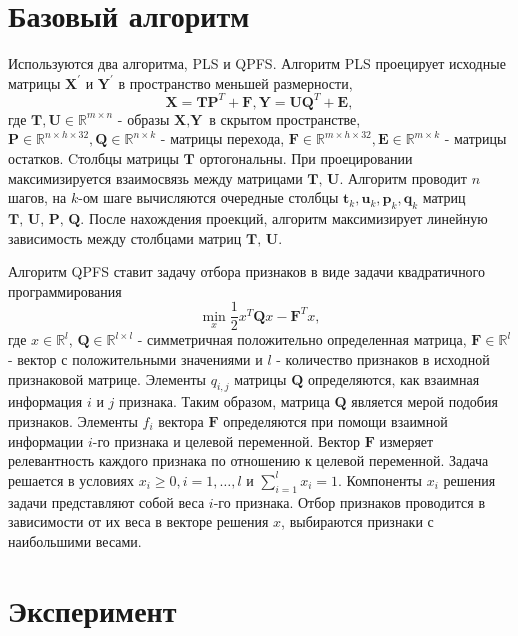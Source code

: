 \documentclass[12pt,twoside]{article}
\begin{document}
\section{Базовый алгоритм}

Используются два алгоритма, PLS и QPFS. 
Алгоритм PLS проецирует исходные матрицы $\textbf{X}^\prime$ и $\textbf{Y}^\prime$ в пространство меньшей размерности, $$\textbf{X} = \textbf{TP}^T + \textbf{F}, \textbf{Y} = \textbf{UQ}^T + \textbf{E} ,$$ где $\textbf{T}, \textbf{U} \in \mathbb{R}^{m \times n}$ 
- образы $\textbf{X}, \textbf{Y}$ в скрытом пространстве, 
$\textbf{P} \in \mathbb{R}^{n \times h \times 32}, \textbf{Q} \in \mathbb{R}^{n \times k}$ - матрицы перехода, 
$\textbf{F} \in \mathbb{R}^{m \times h \times 32}, \textbf{E} \in \mathbb{R}^{m \times k}$ - матрицы остатков. Cтолбцы матрицы $\textbf{T}$ ортогональны. При проецировании максимизируется взаимосвязь между матрицами $\textbf{T, U}$. Алгоритм проводит $n$ шагов, на $k$-ом шаге вычисляются очередные столбцы $\textbf{t}_k,\textbf{u}_k,\textbf{p}_k,\textbf{q}_k$ матриц $\textbf{T, U, P, Q}.$
После нахождения проекций, алгоритм максимизирует линейную зависимость между столбцами матриц $\textbf{T, U}.$

Алгоритм QPFS ставит задачу отбора признаков в виде задачи квадратичного программирования $$\min_x \frac1{2} x^T \textbf{Q}x- \textbf{F}^Tx ,$$
где $x \in \mathbb{R}^l$, $\textbf{Q} \in \mathbb{R}^{l \times l}$ - симметричная положительно определенная матрица, $\textbf{F} \in \mathbb{R}^l$ - вектор с положительными значениями и $l$ - количество признаков в исходной признаковой матрице. Элементы $q_{i,j}$ матрицы $\textbf{Q}$ определяются, как взаимная информация $i$ и $j$ признака. Таким образом, матрица $\textbf{Q}$ является мерой подобия признаков. Элементы $f_i$ вектора $\textbf{F}$ определяются при помощи взаимной информации $i$-го признака и целевой переменной. Вектор $\textbf{F}$ измеряет релевантность каждого признака по отношению к целевой переменной. Задача решается в условиях $x_i \geq 0, i = 1, \dots, l$ и $\sum\limits^l_{i=1} x_i = 1$. Компоненты $x_i$ решения задачи представляют собой веса $i$-го признака. Отбор признаков проводится в зависимости от их веса в векторе решения $x$, выбираются признаки с наибольшими весами.

\section{Эксперимент}
\end{document}
